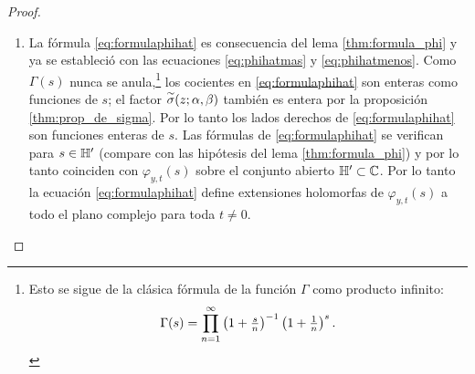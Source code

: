 \documentclass[../../tesis_maestria]{subfiles}
\begin{document}
\begin{proof}
\begin{enumerate}[label=\emph{\roman*})]
  Ahora probamos que la sucesi\'on $\{f_N(s)\}$ converge uniformemente sobre compactos para poder
  aplicar el teorema de Weierstrass y concluir que el l\'imite de las $f_N$'s, que es claramente
  $\varphi_{y,t}(s)$, es holomorfa sobre $\HH'$. Para esto, sea $Q\subset\HH'$ un compacto donde
  para toda $s\in Q$ existe una constante $\eps>0$ tal que $0<\eps<\Re(s)$. Con la aproximaci\'on
  \eqref{eq:approxdephi}, tenemos que para $N$ suficientemente grande, hay una constante positiva
  $M>0$ tal que
  \[
    \abs{\phi(x+iy;s)}\leq M\abs{x}^{-2\Re(s)-1}<M\abs{x}^{-2\eps-1}\qquad\forall |x|>N
  \]
  Por lo tanto, para $N$ suficientemente grande tenemos que:
  \begin{align*}
    \abs{\varphi_{y,t}(s)-f_N(s)}
    &=\abs{\int_{\abs{x}>N}\phi(x+iy;s)e^{-2\pi i tx}dx}\\
    &\leq\int_{\abs{x}>N}\abs{\phi(x+iy;s)}dx\\
    &< M \int_{\abs{x}>N}\abs{x}^{-2\eps-1}dx
      =M\int_{-\infty}^{-N}(-x)^{-2\eps-1}dx+M\int_{N}^{\infty}x^{-2\eps-1}dx\\
    &<\frac{M}{\eps N^{2\eps}}.
  \end{align*}
  Esta aproximaci\'on implica que la sucesi\'on $\{f_N(s)\}$ converge uniformemente a
  $\varphi_{y,t}(s)$ para toda $s\in Q$. Por el teorema de Weierstrass podemos concluir que
  $\varphi_{y,t}(s)$ es holomorfo sobre $\HH'$.

\item La f\'ormula \eqref{eq:formulaphihat} es consecuencia del lema \ref{thm:formula_phi}
  y ya se estableci\'o con las ecuaciones \eqref{eq:phihatmas} y \eqref{eq:phihatmenos}.
  Como $\Gamma(s)$ nunca se anula,\footnote{Esto se sigue de la cl\'asica f\'ormula de la
    funci\'on $\Gamma$ como producto infinito:
    $$\Gamma(s)=\prod_{n=1}^{\infty}\left( 1+\tfrac{s}{n} \right)^{-1}\left( 1+\tfrac{1}{n} \right)^s.$$}
  los cocientes en \eqref{eq:formulaphihat} son enteras como funciones de $s$; el factor
  $\overset{\sim}{\sigma}(z;\alpha,\beta)$ tambi\'en es entera por la proposici\'on \ref{thm:prop_de_sigma}.
  Por lo tanto los lados derechos de \eqref{eq:formulaphihat} son funciones enteras de $s$.
  Las f\'ormulas de \eqref{eq:formulaphihat} se verifican para $s\in\mathbb{H}'$ (compare con
  las hip\'otesis del lema \ref{thm:formula_phi}) y por lo tanto coinciden con
  $\varphi_{y,t}(s)$ sobre el conjunto abierto $\mathbb{H}'\subset\mathbb{C}$. Por lo tanto la
  ecuaci\'on \eqref{eq:formulaphihat} define extensiones holomorfas de $\varphi_{y,t}(s)$
  a todo el plano complejo para toda $t\neq0$. 


\end{enumerate}
\end{proof}
\end{document}
